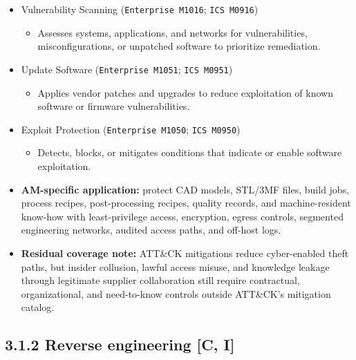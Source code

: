 \documentclass[10pt,a4paper,oneside]{report}
\begin{document}
\begin{itemize}
\begin{itemize}
\begin{itemize}
\item Collects and analyzes threat intelligence to track trends, guide defensive priorities, and reduce risk.
\end{itemize}
\item Vulnerability Scanning (\texttt{Enterprise M1016}; \texttt{ICS M0916})
\begin{itemize}
\item Assesses systems, applications, and networks for vulnerabilities, misconfigurations, or unpatched software to prioritize remediation.
\end{itemize}
\item Update Software (\texttt{Enterprise M1051}; \texttt{ICS M0951})
\begin{itemize}
\item Applies vendor patches and upgrades to reduce exploitation of known software or firmware vulnerabilities.
\end{itemize}
\item Exploit Protection (\texttt{Enterprise M1050}; \texttt{ICS M0950})
\begin{itemize}
\item Detects, blocks, or mitigates conditions that indicate or enable software exploitation.
\end{itemize}
\end{itemize}
\end{itemize}

\begin{itemize}
\item \textbf{AM-specific application:} protect CAD models, STL/3MF files, build jobs, process recipes, post-processing recipes, quality records, and machine-resident know-how with least-privilege access, encryption, egress controls, segmented engineering networks, audited access paths, and off-host logs.
\end{itemize}

\begin{itemize}
\item \textbf{Residual coverage note:} ATT\&CK mitigations reduce cyber-enabled theft paths, but insider collusion, lawful access misuse, and knowledge leakage through legitimate supplier collaboration still require contractual, organizational, and need-to-know controls outside ATT\&CK's mitigation catalog.
\end{itemize}


\subsection{3.1.2 Reverse engineering [C, I]}
\end{document}
